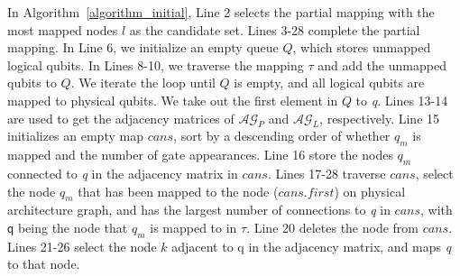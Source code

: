 \documentclass[runningheads]{llncs}
\begin{document}
In Algorithm~\ref{algorithm_initial}, Line 2 selects the partial mapping with the most mapped nodes $l$ as the candidate set. Lines 3-28 complete the partial mapping.
 In Line 6, we initialize an empty queue $Q$, which stores unmapped logical qubits. In Lines 8-10, we traverse the mapping $\tau$ and add the unmapped qubits to $Q$. We iterate the loop until $Q$ is empty, and all logical qubits are mapped to physical qubits. We take out the first element in $Q$ to \textit{q}. Lines 13-14 are used to get the adjacency matrices of $\mathcal{AG}_{P}$ and $\mathcal{AG}_{L}$, respectively. Line 15 initializes an empty map $cans$, sort by a descending order of whether $\textit{q}_\textit{m}$ is mapped and the number of gate appearances. Line 16 store the nodes $\textit{q}_\textit{m}$ connected to \textit{q} in the adjacency matrix in $ cans$. Lines 17-28 traverse  $cans$, select the node $\textit{q}_\textit{m}$ that has been mapped to the node ($cans.first$) on physical architecture graph, and  has the largest number of connections to \textit{q} in $cans$, with $ \textsf{q}$ being the node that $\textit{q}_\textit{m}$ is mapped to  in $\tau$.  Line 20 deletes the node from $cans$. Lines 21-26 select the node $k$ adjacent to \textsf{q} in the adjacency matrix, and maps \textit{q} to that node.
\end{document}
